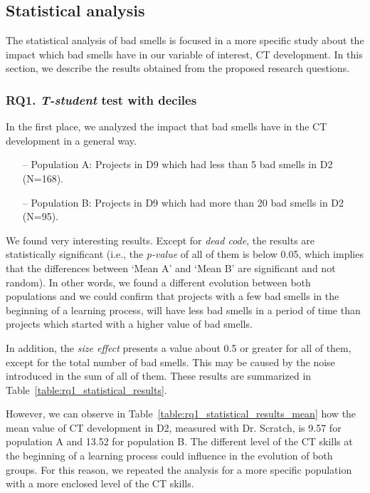 \subsection{Statistical analysis}
\label{subsec:results_statistical}

The statistical analysis of bad smells is focused in a more specific study about the impact which bad smells have in our variable of interest, CT development. In this section, we describe the results obtained from the proposed research questions. 

\subsubsection{RQ1. \textit{T-student} test with deciles}
\label{subsubsec:rq1_statistical_results}

In the first place, we analyzed the impact that bad smells have in the CT development in a general way.

\begin{itemize}
    \item[--] Population A: Projects in D9 which had less than 5 bad smells in D2 (N=168).
    \item[--] Population B: Projects in D9 which had more than 20 bad smells in D2 (N=95).
\end{itemize}

We found very interesting results. Except for \textit{dead code}, the results are statistically significant (i.e., the \textit{p-value} of all of them is below 0.05, which implies that the differences between `Mean A' and `Mean B' are significant and not random). In other words, we found a  different evolution between both populations and we could confirm that projects with a few bad smells in the beginning of a learning process, will have less bad smells in a period of time than projects which started with a higher value of bad smells. 

In addition, the \textit{size effect} presents a value about 0.5 or greater for all of them, except for the total number of bad smells. This may be caused by the noise introduced in the sum of all of them. These results are summarized in Table~\ref{table:rq1_statistical_results}.

However, we can observe in Table~\ref{table:rq1_statistical_results_mean} how the mean value of CT development in D2, measured with Dr. Scratch, is 9.57 for population A and 13.52 for population B. The different level of the CT skills at the beginning of a learning process could influence in the evolution of both groups. For this reason, we repeated the analysis for a more specific population with a more enclosed level of the CT skills.


